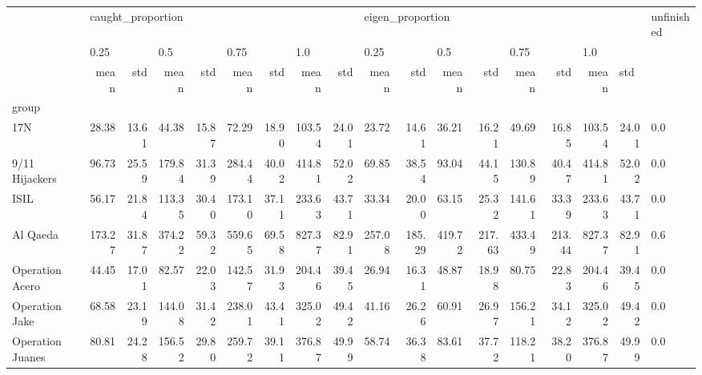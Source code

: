 \begin{tabular}{lrrrrrrrrrrrrrrrrl}
\toprule
{} & \multicolumn{8}{l}{caught\_proportion} & \multicolumn{8}{l}{eigen\_proportion} & unfinished \\
{} & \multicolumn{2}{l}{0.25} & \multicolumn{2}{l}{0.5} & \multicolumn{2}{l}{0.75} & \multicolumn{2}{l}{1.0} & \multicolumn{2}{l}{0.25} & \multicolumn{2}{l}{0.5} & \multicolumn{2}{l}{0.75} & \multicolumn{3}{l}{1.0} \\
{} &              mean &    std &    mean &    std &    mean &    std &    mean &    std &             mean &     std &    mean &     std &    mean &     std &    mean & \multicolumn{2}{l}{std} \\
group                &                   &        &         &        &         &        &         &        &                  &         &         &         &         &         &         &        &            \\
\midrule
17N                  &             28.38 &  13.61 &   44.38 &  15.87 &   72.29 &  18.90 &  103.54 &  24.01 &            23.72 &   14.61 &   36.21 &   16.21 &   49.69 &   16.85 &  103.54 &  24.01 &        0.0 \\
9/11 Hijackers       &             96.73 &  25.59 &  179.84 &  31.39 &  284.44 &  40.02 &  414.81 &  52.02 &            69.85 &   38.54 &   93.04 &   44.15 &  130.89 &   40.47 &  414.81 &  52.02 &        0.0 \\
ISIL                 &             56.17 &  21.84 &  113.35 &  30.40 &  173.10 &  37.11 &  233.63 &  43.71 &            33.34 &   20.00 &   63.15 &   25.32 &  141.61 &   33.39 &  233.63 &  43.71 &        0.0 \\
Al Qaeda             &            173.27 &  31.87 &  374.22 &  59.32 &  559.65 &  69.58 &  827.37 &  82.91 &           257.08 &  185.29 &  419.72 &  217.63 &  433.49 &  213.44 &  827.37 &  82.91 &        0.6 \\
Operation Acero      &             44.45 &  17.01 &   82.57 &  22.03 &  142.57 &  31.93 &  204.46 &  39.45 &            26.94 &   16.31 &   48.87 &   18.98 &   80.75 &   22.83 &  204.46 &  39.45 &        0.0 \\
Operation Jake       &             68.58 &  23.19 &  144.08 &  31.42 &  238.01 &  43.41 &  325.02 &  49.42 &            41.16 &   26.26 &   60.91 &   26.97 &  156.21 &   34.12 &  325.02 &  49.42 &        0.0 \\
Operation Juanes     &             80.81 &  24.28 &  156.52 &  29.80 &  259.72 &  39.11 &  376.87 &  49.99 &            58.74 &   36.38 &   83.61 &   37.72 &  118.21 &   38.20 &  376.87 &  49.99 &        0.0 \\

\end{tabular}
